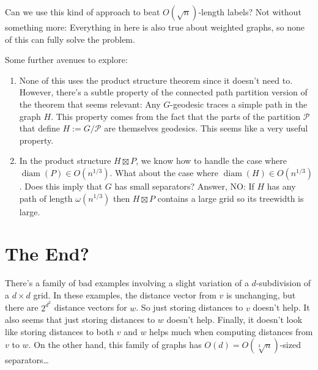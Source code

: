 \documentclass{patmorin}
\DeclareMathOperator{\diam}{diam}
\begin{document}
Can we use this kind of approach to beat $O(\sqrt{n})$-length labels?
Not without something more: Everything in here is also true about weighted graphs, so none of this can fully solve the problem.








Some further avenues to explore:
\begin{enumerate}
    \item None of this uses the product structure theorem since it doesn't need to.  However, there's a subtle property of the connected path partition version of the theorem that seems relevant:  Any $G$-geodesic traces a simple path in the graph $H$.  This property comes from the fact that the parts of the partition $\mathcal{P}$ that define $H:=G/\mathcal{P}$ are themselves geodesics.  This seems like a very useful property.

    \item In the product structure $H\boxtimes P$, we know how to handle the case where $\diam(P)\in O(n^{1/3})$.  What about the case where $\diam(H)\in O(n^{1/3})$.  Does this imply that $G$ has small separators?  Answer, NO: If $H$ has any path of length $\omega(n^{1/3})$ then $H\boxtimes P$ contains a large grid so its treewidth is large.

\end{enumerate}


\section{The End?}

There's a family of bad examples involving a slight variation of a $d$-subdivision of a $d\times d$ grid.  In these examples, the distance vector from $v$ is unchanging, but there are $2^{d^2}$ distance vectors for $w$.  So just storing distances to $v$ doesn't help.  It also seems that just storing distances to $w$ doesn't help.  Finally, it doesn't look like storing distances to both $v$ and $w$ helps much when computing distances from $v$ to $w$.  On the other hand, this family of graphs has $O(d)=O(\sqrt[3]{n})$-sized separators\ldots
\end{document}
